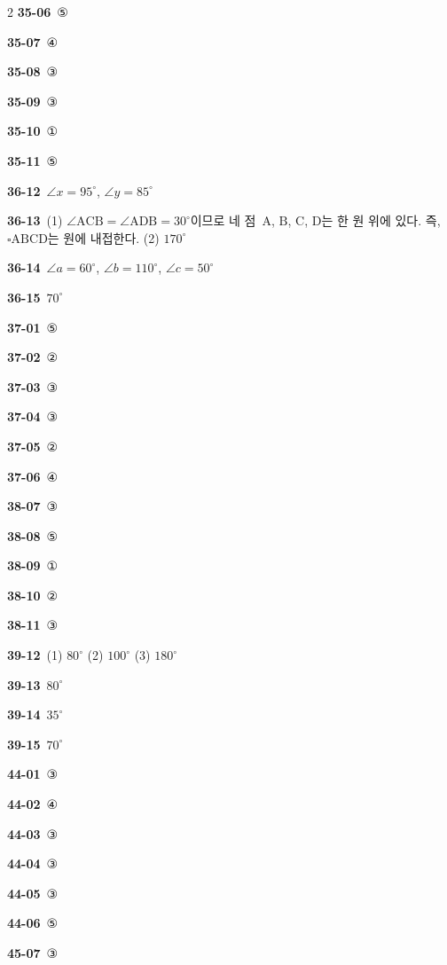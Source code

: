 \documentclass[10pt,a4paper]{article}
\newcommand{\pt}[1]{\mathrm{#1}}
\begin{document}
\begin{multicols}{2}
\noindent\textbf{35-06}\ ⑤\par
\noindent\textbf{35-07}\ ④\par
\noindent\textbf{35-08}\ ③\par
\noindent\textbf{35-09}\ ③\par
\noindent\textbf{35-10}\ ①\par
\noindent\textbf{35-11}\ ⑤\par
\noindent\textbf{36-12}\ $\angle x=95^\circ$, $\angle y=85^\circ$\par
\noindent\textbf{36-13}\ (1) $\angle\pt{ACB}=\angle\pt{ADB}=30^\circ$이므로 네 점~$\pt{A}$, $\pt{B}$, $\pt{C}$, $\pt{D}$는 한 원 위에 있다. 즉, $\square\pt{ABCD}$는 원에 내접한다. (2) $170^\circ$\par
\noindent\textbf{36-14}\ $\angle a=60^\circ$, $\angle b=110^\circ$, $\angle c=50^\circ$\par
\noindent\textbf{36-15}\ $70^\circ$\par
\noindent\textbf{37-01}\ ⑤\par
\noindent\textbf{37-02}\ ②\par
\noindent\textbf{37-03}\ ③\par
\noindent\textbf{37-04}\ ③\par
\noindent\textbf{37-05}\ ②\par
\noindent\textbf{37-06}\ ④\par
\noindent\textbf{38-07}\ ③\par
\noindent\textbf{38-08}\ ⑤\par
\noindent\textbf{38-09}\ ①\par
\noindent\textbf{38-10}\ ②\par
\noindent\textbf{38-11}\ ③\par
\noindent\textbf{39-12}\ (1) $80^\circ$ (2) $100^\circ$ (3) $180^\circ$\par
\noindent\textbf{39-13}\ $80^\circ$\par
\noindent\textbf{39-14}\ $35^\circ$\par
\noindent\textbf{39-15}\ $70^\circ$\par
\noindent\textbf{44-01}\ ③\par
\noindent\textbf{44-02}\ ④\par
\noindent\textbf{44-03}\ ③\par
\noindent\textbf{44-04}\ ③\par
\noindent\textbf{44-05}\ ③\par
\noindent\textbf{44-06}\ ⑤\par
\noindent\textbf{45-07}\ ③\par

\end{multicols}
\end{document}
